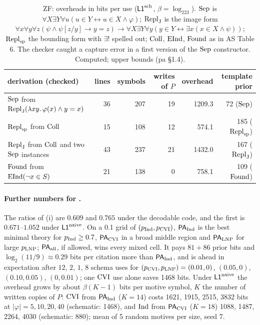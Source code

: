 \begin{table}[ht]\centering\footnotesize
\begin{tabular}{@{}lrrrrr@{}}
\toprule
derivation (checked) & lines & symbols & writes of $P$ & overhead & template prior\\
\midrule
$\mathrm{Sep}$ from $\mathrm{Repl}_{\mathrm{J}}(\lambda xy.\,\varphi(x)\wedge y=x)$ & 36 & 207 & 19 & 1209.3 & 72 ($\mathrm{Sep}$)\\
$\mathrm{Repl}_{\mathrm{sp}}$ from $\mathrm{Coll}$ & 15 & 108 & 12 & 574.1 & 185 ($\mathrm{Repl}_{\mathrm{sp}}$)\\
$\mathrm{Repl}_{\mathrm{J}}$ from $\mathrm{Coll}$ and two $\mathrm{Sep}$ instances & 43 & 237 & 21 & 1432.0 & 167 ($\mathrm{Repl}_{\mathrm{J}}$)\\
$\mathrm{Found}$ from $\mathrm{EInd}(\neg x\in S)$ & 21 & 138 & 0 & 758.1 & 109 ($\mathrm{Found}$)\\
\bottomrule
\end{tabular}
\caption{ZF: overheads in bits per use ($\mathord{\mathsf{L1}}^{\mathrm{sch}}$, $\beta=\log_223$). $\mathrm{Sep}$ is $\forall X\exists Y\forall u(u\in Y\leftrightarrow u\in X\wedge\varphi)$; $\mathrm{Repl}_{\mathrm{J}}$ is the image form $\forall x\forall y\forall z(\psi\wedge\psi[z/y]\to y=z)\to\forall X\exists Y\forall y(y\in Y\leftrightarrow\exists x(x\in X\wedge\psi))$; $\mathrm{Repl}_{\mathrm{sp}}$ the bounding form with $\exists!$ spelled out; $\mathrm{Coll}$, $\mathrm{EInd}$, $\mathrm{Found}$ as in AS Table 6. The checker caught a capture error in a first version of the $\mathrm{Sep}$ constructor. Computed; upper bounds (pa \S1.4).}\label{tab:pa:zf}
\end{table}

\paragraph{Further numbers for .} The ratios of (i) are $0.609$ and $0.765$ under the decodable code, and the first is $0.671$--$1.052$ under $\mathord{\mathsf{L1}}^{\mathrm{naive}}$. On a 0.1 grid of $(p_{\mathrm{Ind}},p_{\mathrm{CVI}})$, $\mathsf{PA}_{\mathrm{Ind}}$ is the best minimal theory for $p_{\mathrm{Ind}}\ge0.7$, $\mathsf{PA}_{\mathrm{CVI}}$ in a broad middle region and $\mathsf{PA}_{\mathrm{LNP}}$ for large $p_{\mathrm{LNP}}$; $\mathsf{PA}_{\mathrm{all}}$, if allowed, wins every mixed cell. It pays $81+86$ prior bits and $\log_2(11/9)\approx0.29$ bits per citation more than $\mathsf{PA}_{\mathrm{Ind}}$, and is ahead in expectation after $12$, $2$, $1$, $8$ schema uses for $(p_{\mathrm{CVI}},p_{\mathrm{LNP}})=(0.01,0)$, $(0.05,0)$, $(0.10,0.05)$, $(0,0.01)$; one $\mathrm{CVI}$ use alone saves 1468 bits. Under $\mathord{\mathsf{L1}}^{\mathrm{naive}}$ the overhead grows by about $\beta(K-1)$ bits per motive symbol, $K$ the number of written copies of $P$: $\mathrm{CVI}$ from $\mathsf{PA}_{\mathrm{Ind}}$ ($K=14$) costs 1621, 1915, 2515, 3832 bits at $|\varphi|=5,10,20,40$ (schematic: 1468), and $\mathrm{Ind}$ from $\mathsf{PA}_{\mathrm{CVI}}$ ($K=18$) 1088, 1487, 2264, 4030 (schematic: 880); mean of 5 random motives per size, seed 7.

